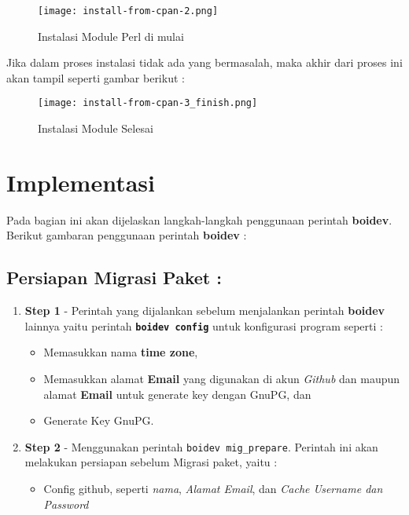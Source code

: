 {\begin{figure}[H]
	\centering
	\texttt{[image: install-from-cpan-2.png]}
	\caption{Instalasi Module Perl di mulai}
	\label{fig:bab2_start_install_module}
\end{figure}

\noindent
Jika dalam proses instalasi tidak ada yang bermasalah, maka akhir dari proses ini akan tampil seperti gambar berikut :

\begin{figure}[H]
	\centering
	\texttt{[image: install-from-cpan-3\_finish.png]}
	\caption{Instalasi Module Selesai}
	\label{fig:bab1_finish_install_module}
\end{figure}

\section{Implementasi}
\label{subsec:implm}
\noindent
Pada bagian ini akan dijelaskan langkah-langkah penggunaan perintah \textbf{boidev}. Berikut gambaran penggunaan perintah \textbf{boidev} :

\subsection{Persiapan Migrasi Paket :}
\begin{enumerate}
	\item \textbf{Step 1} - Perintah yang dijalankan sebelum menjalankan perintah \textbf{boidev} lainnya yaitu perintah \textbf{\texttt{boidev config}} untuk konfigurasi program seperti :
	\label{itm:pre_step1}
	\begin{itemize}
		\item Memasukkan nama \textbf{time zone},
		\item Memasukkan alamat \textbf{Email} yang digunakan di akun \textit{Github} dan maupun alamat \textbf{Email} untuk generate key dengan GnuPG, dan
		\item Generate Key GnuPG.
	\end{itemize}
	
	\item \textbf{Step 2} - Menggunakan perintah \texttt{boidev mig\_prepare}. Perintah ini akan melakukan persiapan sebelum Migrasi paket, yaitu :
	\label{itm:pre_step2}
	\begin{itemize}
		\item Config github, seperti \textit{nama}, \textit{Alamat Email}, dan \textit{Cache Username dan Password}
		

\end{itemize}
\end{enumerate}}
